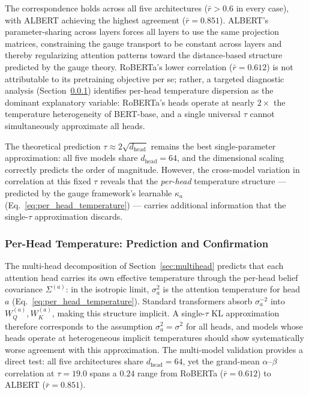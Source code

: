 \documentclass[twoside,11pt]{article}
\begin{document}
The correspondence holds across all five architectures ($\bar{r} > 0.6$ in every case), with ALBERT achieving the highest agreement ($\bar{r} = 0.851$). ALBERT's parameter-sharing across layers forces all layers to use the same projection matrices, constraining the gauge transport to be constant across layers and thereby regularizing attention patterns toward the distance-based structure predicted by the gauge theory. RoBERTa's lower correlation ($\bar{r} = 0.612$) is not attributable to its pretraining objective per se; rather, a targeted diagnostic analysis (Section~\ref{sec:temp_dispersion}) identifies per-head temperature dispersion as the dominant explanatory variable: RoBERTa's heads operate at nearly $2\times$ the temperature heterogeneity of BERT-base, and a single universal $\tau$ cannot simultaneously approximate all heads.

The theoretical prediction $\tau \approx 2\sqrt{d_{\text{head}}}$ remains the best single-parameter approximation: all five models share $d_{\text{head}} = 64$, and the dimensional scaling correctly predicts the order of magnitude. However, the cross-model variation in correlation at this fixed $\tau$ reveals that the \emph{per-head} temperature structure --- predicted by the gauge framework's learnable $\kappa_a$ (Eq.~\ref{eq:per_head_temperature}) --- carries additional information that the single-$\tau$ approximation discards.


\subsubsection{Per-Head Temperature: Prediction and Confirmation}
\label{sec:temp_dispersion}

The multi-head decomposition of Section~\ref{sec:multihead} predicts that each attention head carries its own effective temperature through the per-head belief covariance $\Sigma^{(a)}$: in the isotropic limit, $\sigma_a^2$ is the attention temperature for head $a$ (Eq.~\ref{eq:per_head_temperature}). Standard transformers absorb $\sigma_a^{-2}$ into $W_Q^{(a)}, W_K^{(a)}$, making this structure implicit. A single-$\tau$ KL approximation therefore corresponds to the assumption $\sigma_a^2 = \sigma^2$ for all heads, and models whose heads operate at heterogeneous implicit temperatures should show systematically worse agreement with this approximation. The multi-model validation provides a direct test: all five architectures share $d_{\text{head}} = 64$, yet the grand-mean $\alpha$--$\beta$ correlation at $\tau = 19.0$ spans a $0.24$ range from RoBERTa ($\bar{r} = 0.612$) to ALBERT ($\bar{r} = 0.851$).
\end{document}
